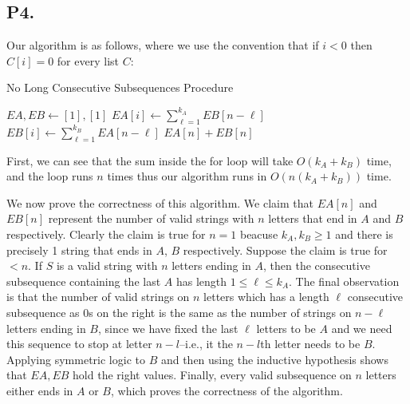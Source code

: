 \documentclass[12pt]{article}
\theoremstyle{definitionstyle}
\begin{document}
    \newpage
    \subsection*{P4.}
    Our algorithm is as follows, where we use the convention that if $i < 0$ then $C[i] = 0$ for every list $C$:
    \begin{algorithm}
        \caption{No Long Consecutive Subsequences Procedure}
        \begin{algorithmic} %
            \State $EA, EB \gets [1], [1]$
                \State $EA[i] \gets \displaystyle \sum_{\ell=1}^{k_A} EB[n-\ell]$
                \State $EB[i] \gets \displaystyle \sum_{\ell=1}^{k_B} EA[n-\ell]$
            \EndFor
            \State \Return $EA[n] + EB[n]$
            \EndProcedure
        \end{algorithmic}
    \end{algorithm}

    First, we can see that the sum inside the for loop will take  $O(k_A+k_B)$ time, and the loop runs $n$ times  thus our algorithm runs in $O(n(k_A+k_B))$ time.

    We now prove the correctness of this algorithm. We claim that $EA[n]$ and $EB[n]$ represent the number of valid strings with $n$ letters that end in $A$ and $B$ respectively. Clearly the claim is true for $n=1$ beacuse $k_A, k_B \geq 1$ and there is precisely 1 string that ends in $A$, $B$ respectively. Suppose the claim is true for $<n$. If $S$ is a valid string with $n$ letters ending in $A$, then the consecutive subsequence containing the last $A$ has length $1 \leq \ell \leq k_A$. The final observation is that the number of valid strings on $n$ letters which has a length $\ell$ consecutive subsequence as 0s on the right is the same as the number of strings on $n-\ell$ letters ending in $B$, since we have fixed the last $\ell$ letters to be $A$ and we need this sequence to stop at letter $n-l$--i.e., it the $n-l$th letter needs to be $B$. Applying symmetric logic to $B$ and then using the inductive hypothesis shows that $EA, EB$ hold the right values. Finally, every valid subsequence on $n$ letters either ends in $A$ or $B$, which proves the correctness of the algorithm.

    \newpage
\end{document}
